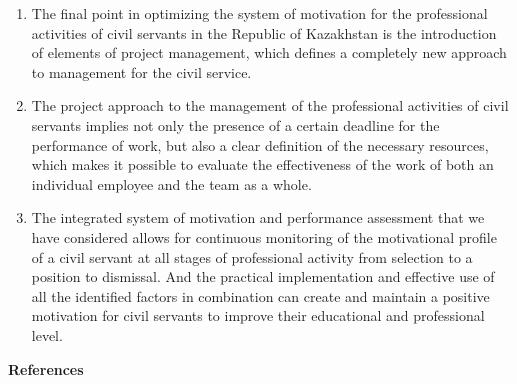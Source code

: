 \begin{enumerate}
\item
The final point in optimizing the system of motivation for the
professional activities of civil servants in the Republic of Kazakhstan
is the introduction of elements of project management, which defines a
completely new approach to management for the civil service.

\item
The project approach to the management of the professional activities
of civil servants implies not only the presence of a certain deadline
for the performance of work, but also a clear definition of the
necessary resources, which makes it possible to evaluate the
effectiveness of the work of both an individual employee and the team as
a whole.

\item
The integrated system of motivation and performance assessment that
we have considered allows for continuous monitoring of the motivational
profile of a civil servant at all stages of professional activity from
selection to a position to dismissal. And the practical implementation
and effective use of all the identified factors in combination can
create and maintain a positive motivation for civil servants to improve
their educational and professional level.
\end{enumerate}

\begin{center}
{\bfseries References}
\end{center}


